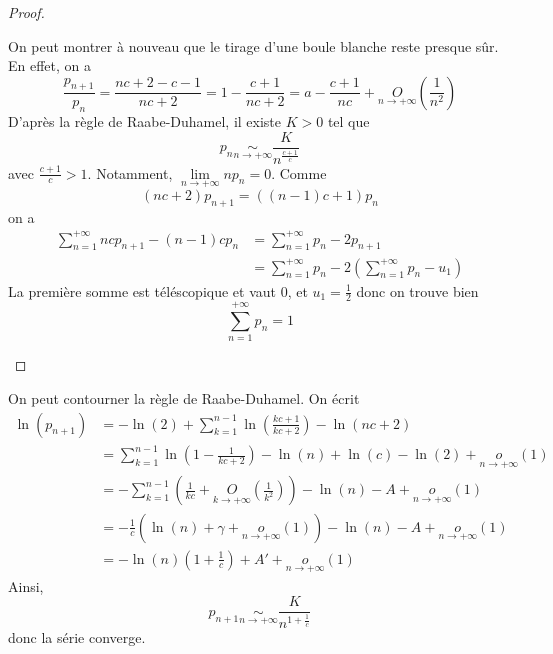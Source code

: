\begin{proof}
\begin{enumerate}
        On peut montrer à nouveau que le tirage d'une boule blanche reste presque sûr. En effet, on a 
        \begin{equation}
            \frac{p_{n+1}}{p_{n}}=\frac{nc+2-c-1}{nc+2}=1-\frac{c+1}{nc+2}=a-\frac{c+1}{nc}+\underset{n\to+\infty}{O}\left(\frac{1}{n^{2}}\right)
        \end{equation}
        D'après la règle de Raabe-Duhamel, il existe $K>0$ tel que 
        \begin{equation}
            p_{n}\underset{n\to+\infty}{\sim}\frac{K}{n^{\frac{c+1}{c}}}
        \end{equation}
        avec $\frac{c+1}{c}>1$. Notamment, $\lim\limits_{n\to+\infty}np_{n}=0$. Comme 
        \begin{equation}
            \left(nc+2\right)p_{n+1}=\left(\left(n-1\right)c+1\right)p_{n}
        \end{equation}
        on a 
        \begin{align}
            \sum_{n=1}^{+\infty}ncp_{n+1}-\left(n-1\right)cp_{n}
            &=\sum_{n=1}^{+\infty}p_{n}-2p_{n+1}\\
            &=\sum_{n=1}^{+\infty}p_{n}-2\left(\sum_{n=1}^{+\infty}p_{n}-u_{1}\right)
        \end{align}
        La première somme est téléscopique et vaut 0, et $u_{1}=\frac{1}{2}$ donc on trouve bien 
        \begin{equation}
            \sum_{n=1}^{+\infty}p_{n}=1
        \end{equation}
    \end{enumerate}
\end{proof}

\begin{remark}
    On peut contourner la règle de Raabe-Duhamel. On écrit 
    \begin{align}
        \ln\left(p_{n+1}\right)
        &=-\ln\left(2\right)+\sum_{k=1}^{n-1}\ln\left(\frac{kc+1}{kc+2}\right)-\ln\left(nc+2\right)\\
        &=\sum_{k=1}^{n-1}\ln\left(1-\frac{1}{kc+2}\right)-\ln\left(n\right)+\ln\left(c\right)-\ln(2)+\underset{n\to+\infty}{o}\left(1\right)\\
        &=-\sum_{k=1}^{n-1}\left(\frac{1}{kc}+\underset{k\to+\infty}{O}\left(\frac{1}{k^{2}}\right)\right)-\ln\left(n\right)-A+\underset{n\to+\infty}{o}\left(1\right)\\
        &=-\frac{1}{c}\left(\ln\left(n\right)+\gamma+\underset{n\to+\infty}{o}\left(1\right)\right)-\ln\left(n\right)-A+\underset{n\to+\infty}{o}\left(1\right)\\
        &=-\ln\left(n\right)\left(1+\frac{1}{c}\right)+A'+\underset{n\to+\infty}{o}\left(1\right)
    \end{align}
    Ainsi, 
    \begin{equation}
        p_{n+1}\underset{n\to+\infty}{\sim}\frac{K}{n^{1+\frac{1}{c}}}
    \end{equation}
    donc la série converge.
\end{remark}

